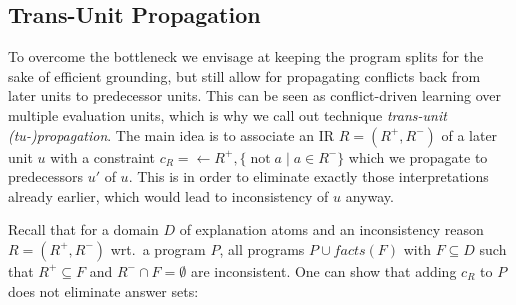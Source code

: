 \documentclass[11pt,fleqn,twoside]{article}
\def\naf{\ensuremath{\mathop{not}}}
\newcommand\hex{{\sc hex}\xspace}
\newcommand{\Program}{\ensuremath{P}}
\newcommand{\toCons}[1]{\mathit{cons}(#1)}
\newcommand{\toFacts}[1]{\mathit{facts}(#1)}
\begin{document}
		\subsection{Trans-Unit Propagation}
		\label{sec:hexprogramevaluation:transunitpropagation}

			To overcome the bottleneck we envisage at keeping the program splits for the sake of efficient grounding,
			but still allow for propagating conflicts back from later units to predecessor units.
			This can be seen as conflict-driven learning over multiple evaluation units,
			which is why we call out technique \emph{trans-unit (tu-)propagation}.
			The main idea is to associate an
			IR $R = (R^{+}, R^{-})$ of a later unit $u$
			with a constraint $c_R = \leftarrow R^{+}, \{ \naf a \mid a \in R^{-} \}$
			which we propagate to predecessors $u'$ of $u$.
			This is in order to eliminate exactly those interpretations already earlier,
			which would lead to inconsistency of $u$ anyway.

			Recall that for a domain $D$ of explanation atoms and an inconsistency reason $R = (R^{+}, R^{-})$ wrt.~a program $\Program$,
			all programs $\Program \cup \toFacts{F}$ with $F \subseteq D$ such that $R^{+} \subseteq F$ and $R^{-} \cap F = \emptyset$ are inconsistent.
			One can show that adding $c_R$ to $\Program$ does not eliminate answer sets:
			


\end{document}
